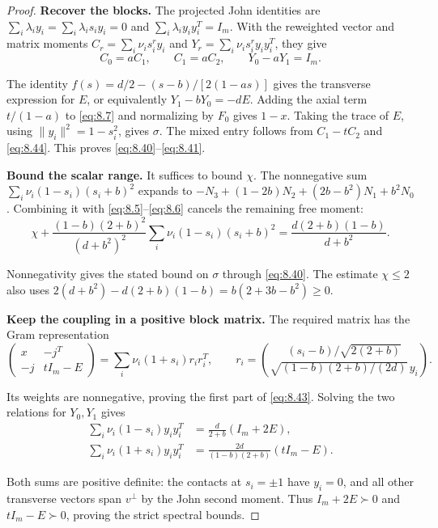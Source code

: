\begin{proof}
\textbf{Recover the blocks.} The projected John identities are
$\sum_i\lambda_i y_i=\sum_i\lambda_i s_i y_i=0$ and
$\sum_i\lambda_i y_iy_i^T=I_m$. With the reweighted vector and matrix moments
$C_r=\sum_i\nu_i s_i^r y_i$ and $Y_r=\sum_i\nu_i s_i^r y_iy_i^T$, they give
\begin{equation}\label{eq:8.44}
C_0=aC_1,\qquad C_1=aC_2,\qquad Y_0-aY_1=I_m.
\end{equation}

The identity $f(s)=d/2-(s-b)/[2(1-as)]$ gives the transverse expression
for $E$, or equivalently $Y_1-bY_0=-dE$.
Adding the axial term $t/(1-a)$ to \eqref{eq:8.7} and normalizing by $F_0$ gives
$1-x$. Taking the trace of $E$, using $\|y_i\|^2=1-s_i^2$, gives $\sigma$.
The mixed entry follows from $C_1-tC_2$ and \eqref{eq:8.44}.
This proves \eqref{eq:8.40}--\eqref{eq:8.41}.

\textbf{Bound the scalar range.} It suffices to bound $\chi$.
The nonnegative sum $\sum_i\nu_i(1-s_i)(s_i+b)^2$ expands to
$-N_3+(1-2b)N_2+(2b-b^2)N_1+b^2N_0$.
Combining it with \eqref{eq:8.5}--\eqref{eq:8.6} cancels the remaining free moment:
\begin{equation}\label{eq:8.45}
\chi+\frac{(1-b)(2+b)^2}{(d+b^2)^2}
\sum_i\nu_i(1-s_i)(s_i+b)^2
=\frac{d(2+b)(1-b)}{d+b^2}.
\end{equation}

Nonnegativity gives the stated bound on $\sigma$ through \eqref{eq:8.40}.
The estimate $\chi\le2$ also uses
$2(d+b^2)-d(2+b)(1-b)=b(2+3b-b^2)\ge0$.

\textbf{Keep the coupling in a positive block matrix.} The required matrix has
the Gram representation
\begin{equation}\label{eq:8.46}
\begin{pmatrix}x&-j^T\\-j&tI_m-E\end{pmatrix}
=\sum_i\nu_i(1+s_i)r_ir_i^T,\qquad
r_i=\binom{(s_i-b)/\sqrt{2(2+b)}}
{\sqrt{(1-b)(2+b)/(2d)}\,y_i}.
\end{equation}

Its weights are nonnegative, proving the first part of \eqref{eq:8.43}.
Solving the two relations for $Y_0,Y_1$ gives
\begin{equation}\label{eq:8.47}
\begin{aligned}
\sum_i\nu_i(1-s_i)y_i y_i^T&=\frac d{2+b}(I_m+2E),\\
\sum_i\nu_i(1+s_i)y_i y_i^T&=\frac{2d}{(1-b)(2+b)}(tI_m-E).
\end{aligned}
\end{equation}

Both sums are positive definite: the contacts at $s_i=\pm1$ have $y_i=0$,
and all other transverse vectors span $v^\perp$ by the John second moment.
Thus $I_m+2E\succ0$ and $tI_m-E\succ0$, proving the strict spectral bounds. 
\end{proof}

